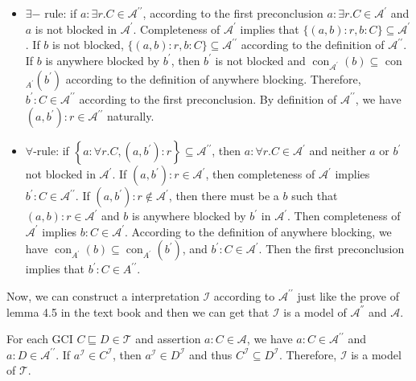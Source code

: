 \documentclass[12pt]{article}
\begin{document}
\begin{itemize}
\begin{itemize}
            \item $\exists-$ rule: if $a: \exists r . C \in \mathcal{A}^{\prime \prime}$, according to the first preconclusion $a: \exists r . C \in \mathcal{A}^{\prime}$ and $a$ is not blocked in $\mathcal{A}^{\prime}$. Completeness of $\mathcal{A}^{\prime}$ implies that $\{(a, b): r, b: C\} \subseteq \mathcal{A}^{\prime}$. If $b$ is not blocked, $\{(a, b): r, b: C\} \subseteq \mathcal{A}^{\prime\prime}$ according to the definition of $\mathcal{A}^{\prime \prime}$. If $b$ is anywhere blocked by $b^{\prime}$, then $b^{\prime}$ is not blocked and $\operatorname{con}_{\mathcal{A}^{\prime}}(b) \subseteq$ con $_{A^{\prime}}\left(b^{\prime}\right)$ according to the definition of anywhere blocking. Therefore, $b^{\prime}: C \in \mathcal{A}^{\prime \prime}$ according to the first preconclusion. By definition of $\mathcal{A}^{\prime \prime}$, we have $\left(a, b^{\prime}\right): r \in \mathcal{A}^{\prime \prime}$ naturally. 
            \item $\forall$-rule: if $\left\{a: \forall r . C,\left(a, b^{\prime}\right): r\right\} \subseteq \mathcal{A}^{\prime \prime}$, then $a: \forall r . C \in \mathcal{A}^{\prime}$ and neither $a$ or $b^{\prime}$ not blocked in $\mathcal{A}^{\prime}$. If $\left(a, b^{\prime}\right): r \in \mathcal{A}^{\prime}$, then completeness of $\mathcal{A}^{\prime}$ implies $b^{\prime}: C \in \mathcal{A}^{\prime \prime}$. If $\left(a, b^{\prime}\right): r \notin \mathcal{A}^{\prime}$, then there must be a $b$ such that $(a, b): r \in \mathcal{A}^{\prime}$ and $b$ is anywhere blocked by $b^{\prime}$ in $\mathcal{A}^{\prime}$. Then completeness of $\mathcal{A}^{\prime}$ implies $b: C \in \mathcal{A}^{\prime}$. According to the definition of anywhere blocking, we have $\operatorname{con}_{A^{\prime}}(b) \subseteq \operatorname{con}_{A^{\prime}}\left(b^{\prime}\right)$, and $b^{\prime}: C \in \mathcal{A}^{\prime}$. Then the first preconclusion implies that $b^{\prime}: C \in A^{\prime \prime}$.
        \end{itemize}
        Now, we can construct a interpretation $\mathcal{I}$ according to $\mathcal{A}^{\prime \prime}$ just like the prove of lemma 4.5 in the text book and then we can get that $\mathcal{I}$ is a model of $\mathcal{A}^{''}$ and $\mathcal{A}$. \par
        For each GCI $C \sqsubseteq D \in \mathcal{T}$ and assertion $a: C \in \mathcal{A}$, we have $a: C \in \mathcal{A}^{\prime \prime}$ and $a: D \in \mathcal{A}^{\prime \prime}$. If $a^\mathcal{I} \in C^\mathcal{I}$, then $a^\mathcal{I} \in D^\mathcal{I}$ and thus $C^\mathcal{I} \subseteq D^\mathcal{I}$. Therefore, $\mathcal{I}$ is a model of $\mathcal{T}$. \par

\end{itemize}
\end{document}
